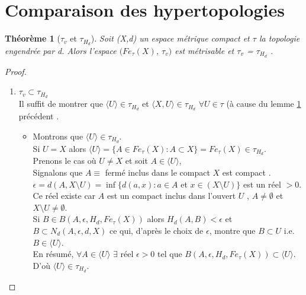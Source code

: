 \documentclass[11pt]{report}
\newenvironment{boxtheorem}
{\begin{tcolorbox}
		[enhanced jigsaw,breakable,pad at break*=2mm,
		colback=black!5,colframe=bleueLeger]}
	{\end{tcolorbox}}
\theoremstyle{styletheorem}
\newtheorem{theoreme}{Théorème}[section]
\newenvironment{theorem}
{\vspace*{0.3cm}\begin{boxtheorem}\begin{theoreme}}{\end{theoreme}\end{boxtheorem}\vspace*{0.3cm}}
\theoremstyle{styledef}
\theoremstyle{remark}
\begin{document}
	\section{Comparaison des hypertopologies}
	\begin{theorem}[$\tau_v$ et $\tau_{H_d}$]\label{31}
		Soit (X,d) un espace métrique compact et $\tau$ la topologie engendrée par d. Alors l'espace $(Fe_{\tau} (X)$, $\tau_v)$ est métrisable et $\tau_{v}$ = $\tau_{H_d}$ \cite{b7}.
	\end{theorem}
	\begin{proof}
		\begin{enumerate}
			\item $\tau_{v} \subset  \tau_{H_d}$\\
			Il suffit de montrer que $\langle U \rangle \in \tau_{H_d}$ et $\langle X, U \rangle \in  \tau_{H_d}$  $\forall U \in \tau$ (à cause du lemme \ref{31} précédent .
			\begin{itemize}
				\item Montrons que $\langle U \rangle \in \tau_{H_d}$.\\
				Si $U = X$ alors $\langle U \rangle  = \lbrace A \in Fe_{\tau}(X) : A \subset X \rbrace = Fe_\tau (X)  \in \tau_{H_d}$.\\ 
				Prenons le cas où $U \neq X$ et soit $A \in \langle U \rangle$, \\ Signalons que $A \equiv$ fermé inclus dans le compact $X$ est compact \cite{b9}.\\
				$\epsilon = d(A, X \setminus U) = \inf \lbrace d(a,x) : a \in A$ et $ x \in (X \setminus U) \rbrace $ est un réel $> 0$. \\ Ce réel existe car $A$ est un compact inclus dans l'ouvert $U$ , $A \neq \emptyset$ et $X \setminus U \neq \emptyset$.\\
				Si $B \in B(A,\epsilon, H_d, Fe_\tau (X))$ alors $H_d (A,B) < \epsilon$  et $B \subset N_d (A, \epsilon, d, X)$ ce qui, d'après le choix de $\epsilon$,  montre que $B \subset U$  i.e. $B \in \langle U \rangle$.\\ En résumé, $\forall A \in \langle U \rangle$ $ \exists$ réel $\epsilon > 0$ tel que $B(A, \epsilon, H_d, Fe_\tau (X)) \subset  \langle U \rangle $.\\
				D'où $\langle U \rangle  \in \tau_{H_d}$.
				

\end{itemize}
\end{enumerate}
\end{proof}
\end{document}
